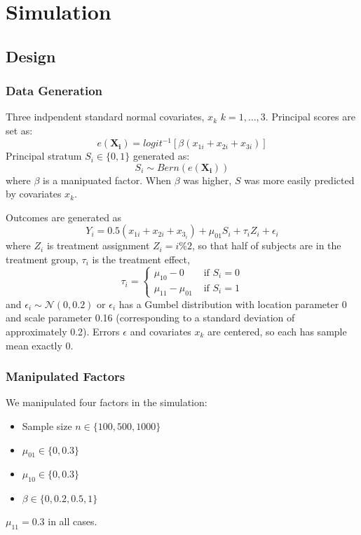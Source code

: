 \documentclass[11pt]{article} %
\newcommand{\ppi}{e(\bm{X_i})}
\begin{document}
\section{Simulation}
\subsection{Design}

\subsubsection{Data Generation}

Three indpendent standard normal covariates, $x_k$ $k=1,\dots,3$.
Principal scores are set as:
\begin{equation*}
  \ppi=logit^{-1}\left[\beta(x_{1i}+x_{2i}+x_{3i})\right]
\end{equation*}
Principal stratum $S_i\in \{0,1\}$ generated as:
\begin{equation*}
S_i\sim Bern(\ppi)
\end{equation*}
where $\beta$ is a manipuated factor.
When $\beta$ was higher, $S$ was more easily predicted by covariates
$x_k$. 

Outcomes are generated as
\begin{equation*}
  Y_i=0.5(x_{1i}+x_{2i}+x_{3_i})+\mu_{01}S_i+\tau_iZ_i+\epsilon_i
\end{equation*}
where $Z_i$ is treatment assignment $Z_i=i\%2$, so that half of
subjects are in the treatment group, $\tau_i$ is the treatment effect,
\begin{equation*}
  \tau_i=\begin{cases}
    \mu_{10}-0&\text{ if }S_i=0\\
    \mu_{11}-\mu_{01}&\text{ if }S_i=1
  \end{cases}
\end{equation*}
and $\epsilon_i\sim \mathcal{N}(0,0.2)$ or $\epsilon_i$ has a Gumbel
distribution with location parameter 0 and scale parameter 0.16
(corresponding to a standard deviation of approximately 0.2).
Errors $\epsilon$ and covariates $x_k$ are centered, so each has
sample mean exactly 0.

\subsubsection{Manipulated Factors}
We manipulated four factors in the simulation:
\begin{itemize}
\item Sample size $n\in\{100,500,1000\}$
\item $\mu_{01}\in\{0,0.3\}$
\item $\mu_{10}\in\{0,0.3\}$
\item $\beta \in \{0,0.2,0.5,1\}$
\end{itemize}
$\mu_{11}=0.3$ in all cases.
\end{document}
